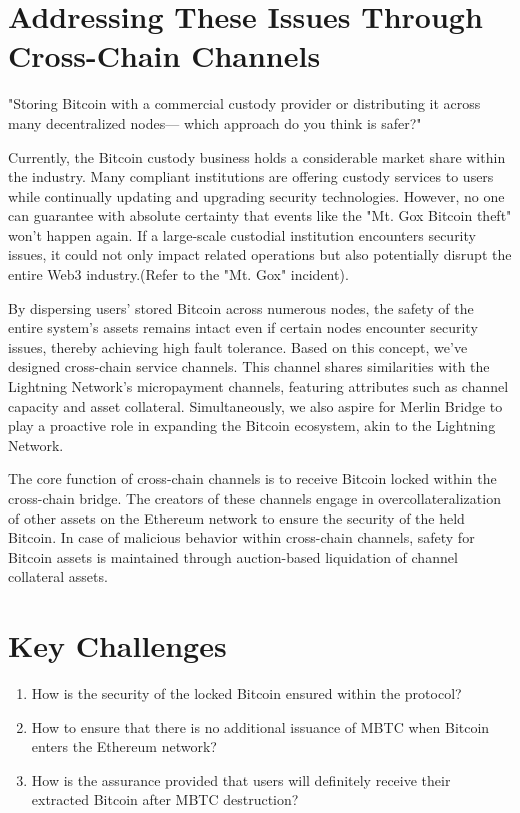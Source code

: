 \documentclass{article}
\begin{document}
\section{Addressing These Issues Through Cross-Chain Channels}
\begin{adjustwidth}{4em}{4em}"Storing Bitcoin with a commercial custody provider or distributing it across many decentralized nodes— which approach do you think is safer?"
\end{adjustwidth}
\par Currently, the Bitcoin custody business holds a considerable market share within the industry. Many compliant institutions are offering custody services to users while continually updating and upgrading security technologies. However, no one can guarantee with absolute certainty that events like the "Mt. Gox Bitcoin theft" won't happen again. If a large-scale custodial institution encounters security issues, it could not only impact related operations but also potentially disrupt the entire Web3 industry.(Refer to the "Mt. Gox" incident).
\par By dispersing users' stored Bitcoin across numerous nodes, the safety of the entire system's assets remains intact even if certain nodes encounter security issues, thereby achieving high fault tolerance. Based on this concept, we've designed cross-chain service channels. This channel shares similarities with the Lightning Network's\cite{ln} micropayment\cite{bitcoinjmicropay} channels, featuring attributes such as channel capacity and asset collateral. Simultaneously, we also aspire for Merlin Bridge to play a proactive role in expanding the Bitcoin ecosystem, akin to the Lightning Network.
\par The core function of cross-chain channels is to receive Bitcoin locked within the cross-chain bridge. The creators of these channels engage in overcollateralization of other assets on the Ethereum network to ensure the security of the held Bitcoin. In case of malicious behavior within cross-chain channels, safety for Bitcoin assets is maintained through auction-based liquidation of channel collateral assets.

\section{Key Challenges}
\begin{enumerate}
    \item How is the security of the locked Bitcoin ensured within the protocol?
    \item How to ensure that there is no additional issuance of MBTC when Bitcoin enters the Ethereum network?
    \item How is the assurance provided that users will definitely receive their extracted Bitcoin after MBTC destruction?
\end{enumerate}
\end{document}

